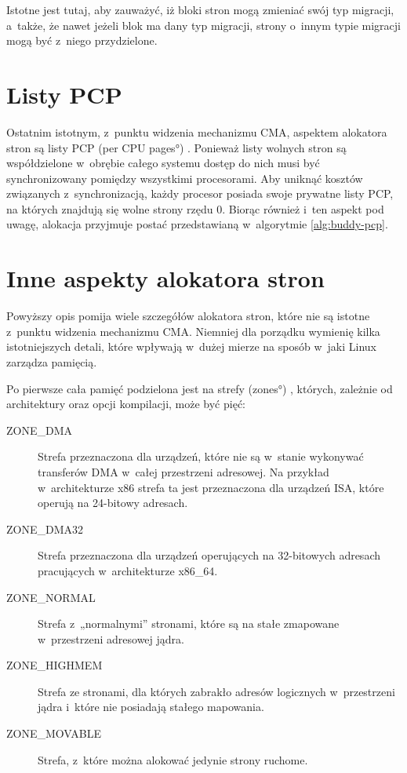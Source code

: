 Istotne jest tutaj, aby zauważyć, iż bloki stron mogą zmieniać swój
typ migracji, a~także, że nawet jeżeli blok ma dany typ migracji,
strony o~innym typie migracji mogą być z~niego przydzielone.


\section{Listy PCP}\label{sec:pcp-lists}

Ostatnim istotnym, z~punktu widzenia mechanizmu CMA, aspektem
alokatora stron są listy PCP (\ang{per CPU pages})
\autocite[podrozdział 8.1.8]{bib:utlk}.  Ponieważ listy wolnych stron
są współdzielone w~obrębie całego systemu dostęp do nich musi być
synchronizowany pomiędzy wszystkimi procesorami.  Aby uniknąć kosztów
związanych z~synchronizacją, każdy procesor posiada swoje prywatne
listy PCP, na których znajdują się wolne strony rzędu 0.  Biorąc
również i~ten aspekt pod uwagę, alokacja przyjmuje postać
przedstawianą w~algorytmie \ref{alg:buddy-pcp}.

\section{Inne aspekty alokatora stron}

Powyższy opis pomija wiele szczegółów alokatora stron, które nie są
istotne z~punktu widzenia mechanizmu CMA.  Niemniej dla porządku
wymienię kilka istotniejszych detali, które wpływają w~dużej mierze na
sposób w~jaki Linux zarządza pamięcią.

Po pierwsze cała pamięć podzielona jest na strefy (\ang{zones})
\autocite[podrozdział 8.1.3]{bib:utlk}, których, zależnie od
architektury oraz opcji kompilacji, może być pięć:

\begin{description}
\item[ZONE\_DMA] Strefa przeznaczona dla urządzeń, które nie są
  w~stanie wykonywać transferów DMA w~całej przestrzeni adresowej.  Na
  przykład w~architekturze x86 strefa ta jest przeznaczona dla
  urządzeń ISA, które operują na 24-bitowy adresach.
\item[ZONE\_DMA32] Strefa przeznaczona dla urządzeń operujących
  na 32-bitowych adresach pracujących w~architekturze x86\_64.
\item[ZONE\_NORMAL] Strefa z~„normalnymi” stronami, które są na
  stałe zmapowane w~przestrzeni adresowej jądra.
\item[ZONE\_HIGHMEM] Strefa ze stronami, dla których zabrakło
  adresów logicznych w~przestrzeni jądra i~które nie posiadają stałego
  mapowania.
\item[ZONE\_MOVABLE] Strefa, z~które można alokować jedynie
  strony ruchome.
\end{description}

